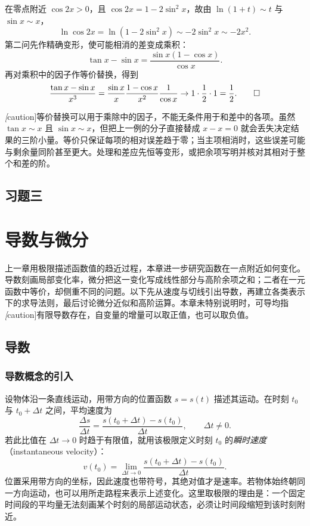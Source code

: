 \documentclass[UTF8,12pt,a4paper,fontset=fandol]{ctexbook}
\begin{document}
\begin{solve}
在零点附近 $\cos2x>0$，且 $\cos2x=1-2\sin^2x$，故由 $\ln(1+t)\sim t$ 与 $\sin x\sim x$，
\[
    \ln\cos2x=\ln(1-2\sin^2x)\sim-2\sin^2x\sim-2x^2.
\]
第二问先作精确变形，使可能相消的差变成乘积：
\[
    \tan x-\sin x=\frac{\sin x(1-\cos x)}{\cos x}.
\]
再对乘积中的因子作等价替换，得到
\[
    \frac{\tan x-\sin x}{x^3}
    =\frac{\sin x}{x}\frac{1-\cos x}{x^2}\frac1{\cos x}
    \to1\cdot\frac12\cdot1=\frac12.
    \qedhere
\]
\end{solve}

\emph[caution]{等价替换可以用于乘除中的因子，不能无条件用于和差中的各项。}虽然 $\tan x\sim x$ 且 $\sin x\sim x$，但把上一例的分子直接替成 $x-x=0$ 就会丢失决定结果的三阶小量。等价只保证每项的相对误差趋于零；当主项相消时，这些误差可能与剩余量同阶甚至更大。处理和差应先恒等变形，或把余项写明并核对其相对于整个和差的阶。

\section*{习题三}

\chapter{导数与微分}
\label{chap:derivatives-and-differentials}

上一章用极限描述函数值的趋近过程，本章进一步研究函数在一点附近如何变化。导数刻画局部变化率，微分把这一变化写成线性部分与高阶余项之和；二者在一元函数中等价，却侧重不同的问题。以下先从速度与切线引出导数，再建立各类表示下的求导法则，最后讨论微分近似和高阶运算。本章未特别说明时，可导均指\emph[caution]{有限导数存在}，自变量的增量可以取正值，也可以取负值。

\section{导数}
\label{sec:derivatives}

\subsection{导数概念的引入}
\label{subsec:introduction-to-derivatives}

设物体沿一条直线运动，用带方向的位置函数 $s=s(t)$ 描述其运动。在时刻 $t_0$ 与 $t_0+\Delta t$ 之间，平均速度为
\[
    \frac{\Delta s}{\Delta t}
    =\frac{s(t_0+\Delta t)-s(t_0)}{\Delta t},\qquad \Delta t\ne0.
\]
若此比值在 $\Delta t\to0$ 时趋于有限值，就用该极限定义时刻 $t_0$ 的\emph{瞬时速度}（instantaneous velocity）：
\[
    v(t_0)=\lim_{\Delta t\to0}
    \frac{s(t_0+\Delta t)-s(t_0)}{\Delta t}.
\]
位置采用带方向的坐标，因此速度也带符号，其绝对值才是速率。若物体始终朝同一方向运动，也可以用所走路程来表示上述变化。这里取极限的理由是：一个固定时间段的平均量无法刻画某个时刻的局部运动状态，必须让时间段缩短到该时刻附近。
\end{document}
